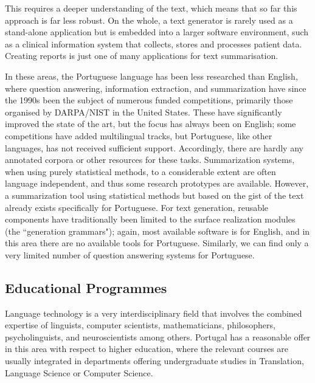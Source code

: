 \begin{multicols}{2}

This requires a deeper understanding of the text, which means that so far this approach is far less robust. On the whole, a text generator is rarely used as a stand-alone application but is embedded into a larger software environment, such as a clinical information system that collects, stores and processes patient data. Creating reports is just one of many applications for text summarisation. 

In these areas, the Portuguese language has been less researched than English, where question answering, information extraction, and summarization have since the 1990s been the subject of numerous funded competitions, primarily those organised by DARPA/NIST in the United States. These have significantly improved the state of the art, but the focus has always been on English; some competitions have added multilingual tracks, but Portuguese, like other languages, has not received sufficient support. Accordingly, there are hardly any annotated corpora or other resources for these tasks. Summarization systems, when using purely statistical methods, to a considerable extent are often language independent, and thus some research prototypes are available. However, a summarization tool using statistical methods but based on the gist of the text already exists specifically for Portuguese. For text generation, reusable components have traditionally been limited to the surface realization modules (the “generation grammars"); again, most available software is for English, and in this area there are no available tools for Portuguese. Similarly, we can find only a very limited number of question answering systems for Portuguese.

\subsection{Educational Programmes}

  Language technology is a very interdisciplinary field that involves the combined expertise of linguists, computer scientists, mathematicians, philosophers, psycholinguists, and neuroscientists among others. Portugal has a reasonable offer in this area with respect to higher education, where the relevant courses are usually integrated in departments offering undergraduate studies in Translation, Language Science or Computer Science.


\end{multicols}
